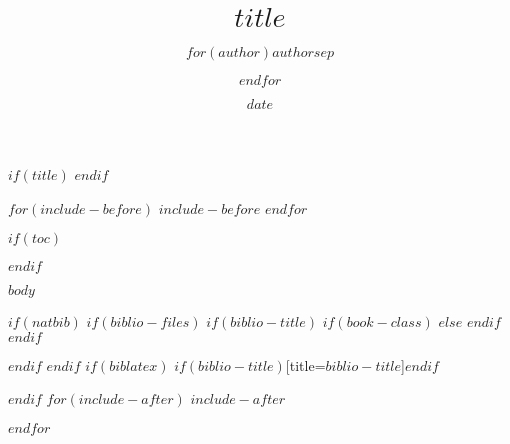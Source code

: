 \documentclass[$if(fontsize)$$fontsize$,$endif$$if(handout)$handout,$endif$$if(beamer)$ignorenonframetext,$endif$]{$documentclass$}
\title{$title$}
\author{$for(author)$$author$$sep$ \and $endfor$}
\date{$date$}
\begin{document}
$if(title)$
\frame{\titlepage}
$endif$

$for(include-before)$
$include-before$
$endfor$

$if(toc)$
\begin{frame}
\tableofcontents[hideallsubsections]
\end{frame}
$endif$


$body$

$if(natbib)$
$if(biblio-files)$
$if(biblio-title)$
$if(book-class)$
\renewcommand\bibname{$biblio-title$}
$else$
\renewcommand\refname{$biblio-title$}
$endif$
$endif$


$endif$
$endif$
$if(biblatex)$
\printbibliography$if(biblio-title)$[title=$biblio-title$]$endif$

$endif$
$for(include-after)$
$include-after$

$endfor$
\end{document}
